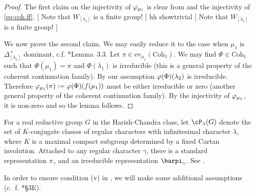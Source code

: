 \documentclass[12pt,a4paper]{amsart}
\newcommand{\trivial}[2][]{\if\relax\detokenize{#1}\relax
  {%
      \color{orange} \vspace{0em} $[$  #2 $]$
      \color{black}
  }
  \else
\ifx#1h
\ifcsname showtrivial\endcsname
{%
    \color{orange} \vspace{0em}  $[$ #2 $]$
    \color{black}
}
\fi
\else {\red Wrong argument!} \fi
\fi
}
\numberwithin{equation}{section}
\theoremstyle{remark}
\def\Coh{\mathrm{Coh}}
\def\ev#1{{\mathrm{ev}_{#1}}}
\begin{document}
\begin{proof}
  The first claim on the injectivity of $\varphi_{\mu_{1}}$ is clear from  and the
  injectivity of \eqref{eq:coh.ff}. \trivial[h]{Note that $W_{[\lambda_{1}]}$ is a
    finite group!}

  We now prove the second claim. We may easily reduce it to the case when $\mu_{1}$ is
  $\Delta ^{+}_{[\lambda_{1}]}$ dominant, c.f. \cite{GI}*{Lemma~3.3}.
  Let $\pi \in \ev{\mu_{1}}(\Coh_{1})$. We may find $\Phi\in \Coh_{1}$ such that
  $\Phi(\mu_{1})=\pi$ and $\Phi(\lambda_{1})$ is irreducible (this is a general property of the coherent continuation family). By our
  assumption $\varphi(\Phi)(\lambda_{2})$ is irreducible. Therefore
  $\varphi_{\mu_{1}}(\pi):=\varphi(\Phi)(f(\mu_{1}))$ must be either
  irreducible or zero (another general property of the coherent continuation family).
  By the injectivity  of $\varphi_{\mu_{1}}$, it is non-zero and so the lemma
  follows.
\end{proof}


For a real reductive group $G$ in the Harish-Chandra class, let $\cP_{\lambda}(G)$ denote the set of $K$-conjugate classes of regular characters with infinitesimal character
        $\lambda$, where $K$ is a maximal compact subgroup determined by a fixed Cartan involution. Attached to any regular character $\gamma$, there is a standard representation $\pi _{\gamma}$ and an irreducible representation $\barpi_{\gamma}$. See \cite{Vg}.
        
In order to ensure condition (v) in , we will make some additional assumptions (c.~f. \cite{GI}*{\S 3E}).  
\end{document}
